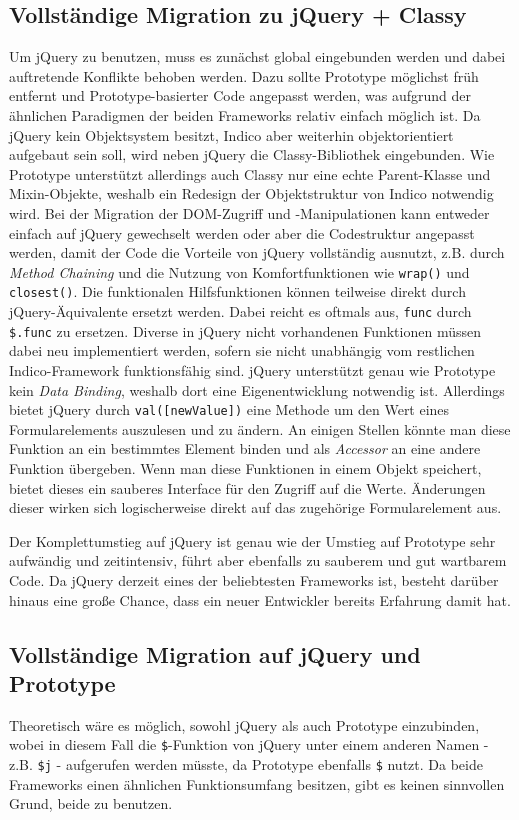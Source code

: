 \subsection{Vollständige Migration zu jQuery + Classy}
Um jQuery zu benutzen, muss es zunächst global eingebunden werden und dabei auftretende Konflikte
behoben werden. Dazu sollte Prototype möglichst früh entfernt und Prototype-basierter Code angepasst
werden, was aufgrund der ähnlichen Paradigmen der beiden Frameworks relativ einfach möglich ist.
Da jQuery kein Objektsystem besitzt, Indico aber weiterhin objektorientiert aufgebaut sein soll,
wird neben jQuery die Classy-Bibliothek eingebunden. Wie Prototype unterstützt allerdings auch
Classy nur eine echte Parent-Klasse und Mixin-Objekte, weshalb ein Redesign der Objektstruktur von
Indico notwendig wird. Bei der Migration der DOM-Zugriff und -Manipulationen kann entweder einfach
auf jQuery gewechselt werden oder aber die Codestruktur angepasst werden, damit der Code die
Vorteile von jQuery vollständig ausnutzt, z.B. durch \emph{Method Chaining} und die
Nutzung von Komfortfunktionen wie \lstinline{wrap()} und \lstinline{closest()}. Die funktionalen
Hilfsfunktionen können teilweise direkt durch jQuery-Äquivalente ersetzt werden. Dabei reicht es
oftmals aus, \lstinline{func} durch \lstinline{$.func} zu ersetzen. Diverse in jQuery nicht
vorhandenen Funktionen müssen dabei neu implementiert werden, sofern sie nicht unabhängig vom
restlichen Indico-Framework funktionsfähig sind. jQuery unterstützt genau wie Prototype kein
\emph{Data Binding}, weshalb dort eine Eigenentwicklung notwendig ist. Allerdings bietet jQuery
durch \lstinline{val([newValue])} eine Methode um den Wert eines Formularelements auszulesen und zu
ändern. An einigen Stellen könnte man diese Funktion an ein bestimmtes Element binden und als
\emph{Accessor} an eine andere Funktion übergeben. Wenn man diese Funktionen in einem Objekt
speichert, bietet dieses ein sauberes Interface für den Zugriff auf die Werte. Änderungen dieser
wirken sich logischerweise direkt auf das zugehörige Formularelement aus.

Der Komplettumstieg auf jQuery ist genau wie der Umstieg auf Prototype sehr aufwändig und
zeitintensiv, führt aber ebenfalls zu sauberem und gut wartbarem Code. Da jQuery derzeit eines der
beliebtesten Frameworks ist, besteht darüber hinaus eine große Chance, dass ein neuer Entwickler
bereits Erfahrung damit hat.


\subsection{Vollständige Migration auf jQuery und Prototype}
Theoretisch wäre es möglich, sowohl jQuery als auch Prototype einzubinden, wobei in diesem Fall die
\lstinline{$}-Funktion von jQuery unter einem anderen Namen - z.B. \lstinline{$j} -
aufgerufen werden müsste, da Prototype ebenfalls \lstinline{$} nutzt. Da beide Frameworks einen
ähnlichen Funktionsumfang besitzen, gibt es keinen sinnvollen Grund, beide zu benutzen.


